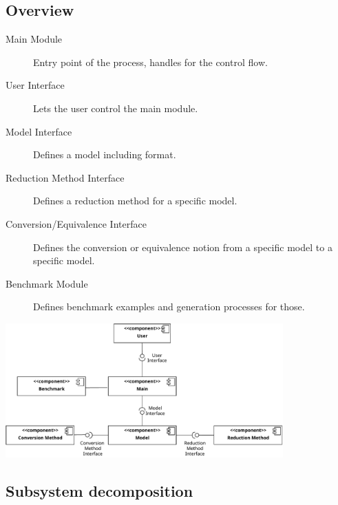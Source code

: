 		\subsection{Overview}
			\begin{description}
				\item[Main Module] Entry point of the process, handles for the control flow.
				\item[User Interface] Lets the user control the main module.
				\item[Model Interface] Defines a model including format.
				\item[Reduction Method Interface] Defines a reduction method for a specific model.
				\item[Conversion/Equivalence Interface] Defines the conversion or equivalence notion from a specific model to a specific model.
				\item[Benchmark Module] Defines benchmark examples and generation processes for those.
			\end{description}
			
			\begin{center}
			 \includegraphics[keepaspectratio, width=0.8\textwidth]{img/components.pdf}
			\end{center}

			
			
		\subsection{Subsystem decomposition}

